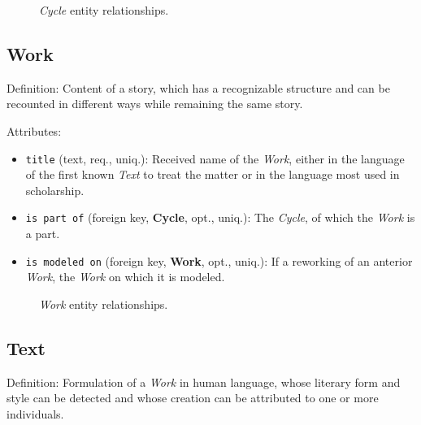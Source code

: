 \begin{figure}[ht]
    \begin{center}
        
    \end{center}
\label{fig:CycleER}
\caption{\textit{Cycle} entity relationships.}
\end{figure}


\subsection{Work}

Definition: Content of a story, which has a recognizable structure and can be recounted in different ways while remaining the same story.

\vspace{1em}
\noindent Attributes:
\begin{itemize}
    \item \texttt{title} (text, req., uniq.): Received name of the \textit{Work}, either in the language of the first known \textit{Text} to treat the matter or in the language most used in scholarship.
    \item \texttt{is part of} (foreign key, \textbf{Cycle}, opt., uniq.): The \textit{Cycle}, of which the \textit{Work} is a part.
    \item \texttt{is modeled on} (foreign key, \textbf{Work}, opt., uniq.): If a reworking of an anterior \textit{Work}, the \textit{Work} on which it is modeled.
\end{itemize}


\begin{figure}[ht]
    \begin{center}
        
    \end{center}
\label{fig:WorkER}
\caption{\textit{Work} entity relationships.}
\end{figure}


\subsection{Text}

Definition: Formulation of a \textit{Work} in human language, whose literary form and style can be detected and whose creation can be attributed to one or more individuals.

